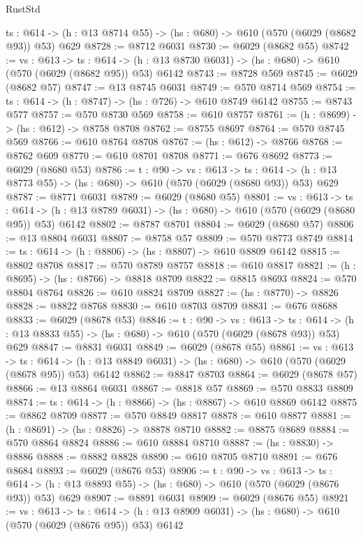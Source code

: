 \begin{lexlean}{RustStd}
\begin{coremodule}
  {ts : @614} -> (h : @13 @8714 @55) -> (hs : @680) -> @610 (@570 (@6029 (@8682 @93)) @53) @629
@8728 := @8712 @6031
@8730 := @6029 (@8682 @55)
@8742 := {vs : @613} ->
  {ts : @614} -> (h : @13 @8730 @6031) -> (hs : @680) -> @610 (@570 (@6029 (@8682 @95)) @53) @6142
@8743 := @8728 @569
@8745 := @6029 (@8682 @57)
@8747 := @13 @8745 @6031
@8749 := @570 @8714 @569
@8754 := {ts : @614} -> (h : @8747) -> (hs : @726) -> @610 @8749 @6142
@8755 := @8743 @577
@8757 := @570 @8730 @569
@8758 := @610 @8757
@8761 := (h : @8699) -> (hs : @612) -> @8758 @8708
@8762 := @8755 @8697
@8764 := @570 @8745 @569
@8766 := @610 @8764 @8708
@8767 := (hs : @612) -> @8766
@8768 := @8762 @609
@8770 := @610 @8701 @8708
@8771 := @676 @8692
@8773 := @6029 (@8680 @53)
@8786 := {t : @90} ->
  {vs : @613} ->
  {ts : @614} -> (h : @13 @8773 @55) -> (hs : @680) -> @610 (@570 (@6029 (@8680 @93)) @53) @629
@8787 := @8771 @6031
@8789 := @6029 (@8680 @55)
@8801 := {vs : @613} ->
  {ts : @614} -> (h : @13 @8789 @6031) -> (hs : @680) -> @610 (@570 (@6029 (@8680 @95)) @53) @6142
@8802 := @8787 @8701
@8804 := @6029 (@8680 @57)
@8806 := @13 @8804 @6031
@8807 := @8758 @57
@8809 := @570 @8773 @8749
@8814 := {ts : @614} -> (h : @8806) -> (hs : @8807) -> @610 @8809 @6142
@8815 := @8802 @8708
@8817 := @570 @8789 @8757
@8818 := @610 @8817
@8821 := (h : @8695) -> (hs : @8766) -> @8818 @8709
@8822 := @8815 @8693
@8824 := @570 @8804 @8764
@8826 := @610 @8824 @8709
@8827 := (hs : @8770) -> @8826
@8828 := @8822 @8768
@8830 := @610 @8703 @8709
@8831 := @676 @8688
@8833 := @6029 (@8678 @53)
@8846 := {t : @90} ->
  {vs : @613} ->
  {ts : @614} -> (h : @13 @8833 @55) -> (hs : @680) -> @610 (@570 (@6029 (@8678 @93)) @53) @629
@8847 := @8831 @6031
@8849 := @6029 (@8678 @55)
@8861 := {vs : @613} ->
  {ts : @614} -> (h : @13 @8849 @6031) -> (hs : @680) -> @610 (@570 (@6029 (@8678 @95)) @53) @6142
@8862 := @8847 @8703
@8864 := @6029 (@8678 @57)
@8866 := @13 @8864 @6031
@8867 := @8818 @57
@8869 := @570 @8833 @8809
@8874 := {ts : @614} -> (h : @8866) -> (hs : @8867) -> @610 @8869 @6142
@8875 := @8862 @8709
@8877 := @570 @8849 @8817
@8878 := @610 @8877
@8881 := (h : @8691) -> (hs : @8826) -> @8878 @8710
@8882 := @8875 @8689
@8884 := @570 @8864 @8824
@8886 := @610 @8884 @8710
@8887 := (hs : @8830) -> @8886
@8888 := @8882 @8828
@8890 := @610 @8705 @8710
@8891 := @676 @8684
@8893 := @6029 (@8676 @53)
@8906 := {t : @90} ->
  {vs : @613} ->
  {ts : @614} -> (h : @13 @8893 @55) -> (hs : @680) -> @610 (@570 (@6029 (@8676 @93)) @53) @629
@8907 := @8891 @6031
@8909 := @6029 (@8676 @55)
@8921 := {vs : @613} ->
  {ts : @614} -> (h : @13 @8909 @6031) -> (hs : @680) -> @610 (@570 (@6029 (@8676 @95)) @53) @6142

\end{coremodule}
\end{lexlean}
